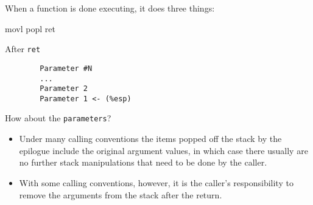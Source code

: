 \begin{frame}[fragile=singleslide]
  \begin{block}{When a function is done executing, it does three things:}
  \end{block}
  \begin{center}
\begin{gascode}
        movl %
        popl %
        ret
\end{gascode}
  \end{center}
\end{frame}

\begin{frame}[fragile=singleslide]
  \begin{block}{After \texttt{ret}}
    \begin{small}
\begin{verbatim}
        Parameter #N
        ...
        Parameter 2
        Parameter 1 <- (%esp)
\end{verbatim}
  \end{small}
\end{block}
  \begin{block}{How about the \texttt{parameters}?}
    \begin{itemize}
    \item Under many calling conventions the items popped off the stack by the epilogue
      include the original argument values, in which case there usually are no further
      stack manipulations that need to be done by the caller.
    \item With some calling conventions, however, it is the caller's responsibility to
      remove the arguments from the stack after the return.
    \end{itemize}
  \end{block}
\end{frame}

